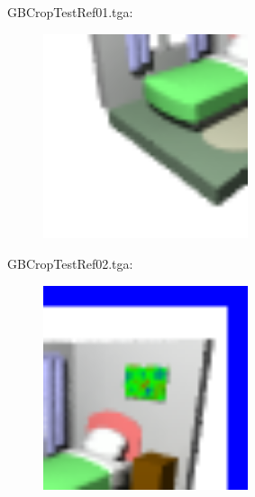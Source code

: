 GBCropTestRef01.tga:\\
\begin{center}
\begin{figure}[H]
\centering\includegraphics[width=6cm]{./GBCropTestRef01.png}\\
\end{figure}
\end{center}

GBCropTestRef02.tga:\\
\begin{center}
\begin{figure}[H]
\centering\includegraphics[width=6cm]{./GBCropTestRef02.png}\\
\end{figure}
\end{center}
